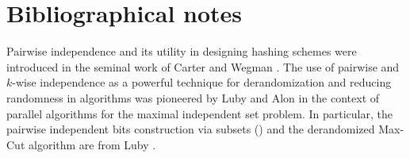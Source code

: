 \section{Bibliographical notes}

Pairwise independence and its utility in designing hashing schemes were
introduced in the seminal work of Carter and Wegman
\cite{cw-uchf-79}. The use of pairwise and $k$-wise independence as a
powerful technique for derandomization and reducing randomness in
algorithms was pioneered by Luby \cite{l-spar-86} and Alon \etal
\cite{abi-fsrpa-86} in the context of parallel algorithms for the maximal
independent set problem. In particular, the pairwise independent bits
construction via subsets () and the derandomized Max-Cut
algorithm are from Luby \cite{l-spar-86}.


\ChapterEnd{}

   
   
